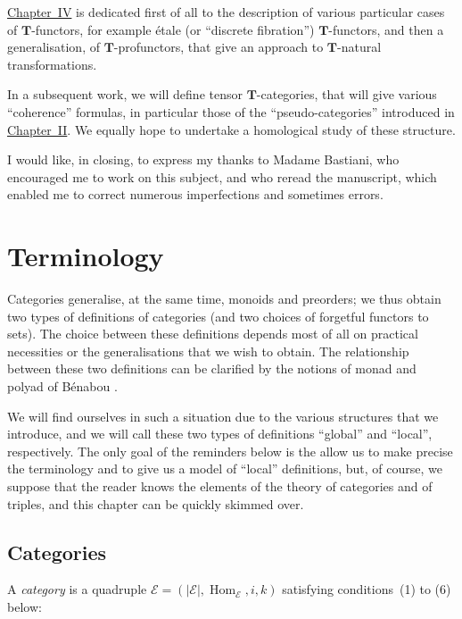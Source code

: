 \documentclass{article}
\newcommand{\oldpage}[1]{\marginpar{\footnotesize$\Big\vert$ \textit{p.~#1}}}
\newcommand{\TT}{\mathbf{T}}
\newcommand{\cat}[1]{\mathcal{#1}}
\newcommand{\set}[1]{|#1|}
\DeclareMathOperator{\Hom}{Hom}
\begin{document}
\hyperref[sec:iv]{Chapter~IV} is dedicated first of all to the description of various particular cases of $\TT$-functors, for example étale (or ``discrete fibration'') $\TT$-functors, and then a generalisation, of $\TT$-profunctors, that give an approach to $\TT$-natural transformations.

In a subsequent work, we will define tensor $\TT$-categories, that will give various ``coherence'' formulas, in particular those of the ``pseudo-categories'' introduced in \hyperref[sec:ii]{Chapter~II}.
We equally hope to undertake a homological study of these structure.

I would like, in closing, to express my thanks to Madame Bastiani, who encouraged me to work on this subject, and who reread the manuscript, which enabled me to correct numerous imperfections and sometimes errors.





\clearpage
\tableofcontents


\clearpage
\setcounter{section}{-1}
\section{Terminology}
\label{sec:0}

\oldpage{219}

Categories generalise, at the same time, monoids and preorders;
we thus obtain two types of definitions of categories (and two choices of forgetful functors to sets).
The choice between these definitions depends most of all on practical necessities or the generalisations that we wish to obtain.
The relationship between these two definitions can be clarified by the notions of monad and polyad of Bénabou \cite{Be}.

We will find ourselves in such a situation due to the various structures that we introduce, and we will call these two types of definitions ``global'' and ``local'', respectively.
The only goal of the reminders below is the allow us to make precise the terminology and to give us a model of ``local'' definitions, but, of course, we suppose that the reader knows the elements of the theory of categories and of triples, and this chapter can be quickly skimmed over.


\subsection{Categories}

A \emph{category} is a quadruple $\cat{E}=(\set{\cat{E}}, \Hom_\cat{E}, i, k)$ satisfying conditions~(1) to (6) below:
\end{document}
